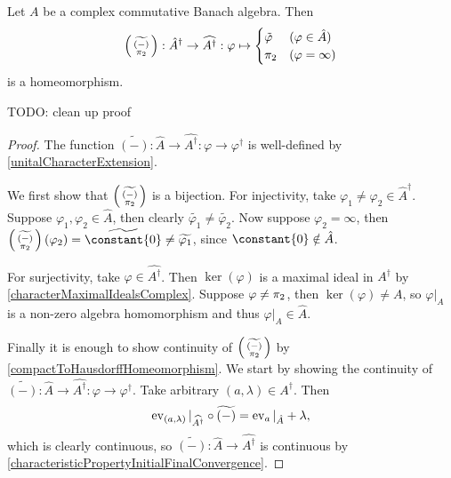 \begin{lemma} \label{compactificationOfCharacterSpaceIsCharacterSpaceOfUnitisation}
Let $A$ be a complex commutative Banach algebra. Then
\[ \left(\begin{smallmatrix}
\widetilde{(-)} \\ \pi_2
\end{smallmatrix}\right): \hat{A}^\dagger \to \widehat{A^\dagger}: \varphi \mapsto \begin{cases}
\tilde{\varphi} & (\varphi \in \hat{A}) \\
\pi_2 & (\varphi = \infty)
\end{cases} \]
is a homeomorphism.
\end{lemma}
TODO: clean up proof
\begin{proof}
The function $\widetilde{(-)}: \hat{A} \to \widehat{A^\dagger}: \varphi \to \varphi^\dagger$ is well-defined by \ref{unitalCharacterExtension}.

We first show that $\left(\begin{smallmatrix}
\widetilde{(-)} \\ \pi_2
\end{smallmatrix}\right)$ is a bijection. For injectivity, take $\varphi_1 \neq \varphi_2\in \hat{A}^\dagger$. Suppose $\varphi_1, \varphi_2\in \hat{A}$, then clearly $\widetilde{\varphi_1} \neq \widetilde{\varphi_2}$. Now suppose $\varphi_2 = \infty$, then $\left(\begin{smallmatrix}
\widetilde{(-)} \\ \proj_2
\end{smallmatrix}\right)(\varphi_2) = \widetilde{\constant{0}} \neq \widetilde{\varphi_1}$, since $\constant{0}\notin \hat{A}$.

For surjectivity, take $\varphi\in \widehat{A^\dagger}$. Then $\ker(\varphi)$ is a maximal ideal in $A^\dagger$ by \ref{characterMaximalIdealsComplex}. Suppose $\varphi \neq \pi_2$, then $\ker(\varphi) \neq A$, so $\varphi|_A$ is a non-zero algebra homomorphism and thus $\varphi|_A\in \hat{A}$.

Finally it is enough to show continuity of $\left(\begin{smallmatrix}
\widetilde{(-)} \\ \pi_2
\end{smallmatrix}\right)$ by \ref{compactToHausdorffHomeomorphism}. We start by showing the continuity of $\widetilde{(-)}: \hat{A} \to \widehat{A^\dagger}: \varphi \to \varphi^\dagger$. Take arbitrary $(a,\lambda)\in A^\dagger$. Then \[ \operatorname{ev}_{(a,\lambda)}|_{\widehat{A^\dagger}}\circ \widetilde{(-)} = \operatorname{ev}_a|_{\hat{A}} + \lambda, \]
which is clearly continuous, so $\widetilde{(-)}: \hat{A} \to \widehat{A^\dagger}$ is continuous by \ref{characteristicPropertyInitialFinalConvergence}.


\end{proof}
